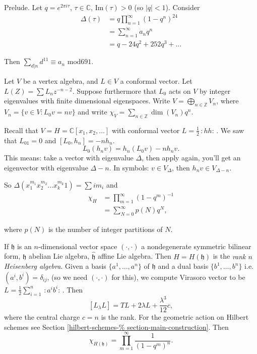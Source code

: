 \medskip\noindent
Prelude. Let $q=e^{2\pi i\tau}$, $\tau \in
\mathbb{C}$,
$\text{Im}(\tau)>0$ (so  $|q|<1$).
Consider
$$
\begin{aligned}
\Delta(\tau)&=q\prod_{n=1}^\infty(1-q^n)^{24}
\\
&=\sum_{n=1}^\infty a_n q^n\\
&=q-24q^2+252q^3+\ldots
\end{aligned}
$$

\noindent
Then $\sum_{d|n}d^{11}\equiv a_n\text{ mod
}691$.

\medskip\noindent
Let $V$ be a vertex algebra,
and $L \in V$ a conformal vector.
Let $L(Z)=\sum L_nz^{-n-2}$.
Suppose furthermore that $L_0$ acts on $V$
by integer eigenvalues with finite
dimensional eigenspaces.
Write $V=\bigoplus_{n \in \mathbb{Z}}V_n$,
where $V_n=\{v \in V:L_0v=nv\}$
and write $\chi_V = \sum_{n \in
\mathbb{Z}}\dim(V_n)q^n$.

\begin{example}
\label{example-heisenberg-character}
Recall that $V=H=\mathbb{C}[x_1,x_2,\ldots]$
with conformal vector
$L=\frac{1}{2}\,:\!hh\!:\,$.
We saw that $L_01=0$ and $[L_0,h_n]=-nh_n$.
$$
L_0(h_nv)=h_n(L_0v)-nh_nv.
$$
This means: take a vector with eigenvalue
$\Delta$,
then apply again, you'll get an eigenvector
with eigenvalue
$\Delta-n$. In symbols: $v \in V_\Delta$,
then
$h_nv \in V_{\Delta-n}$.

So $\Delta(x_1^{m_1}x_2^{m_2}\ldots
x_k^{m_k}1)=\sum i m_i$
and
\begin{equation}
\label{equation-character-heisenberg}
\begin{aligned}
\chi_H&=\prod_{m=1}^\infty(1-q^m)^{-1}\\
&=\sum_{N=0}^\infty p(N)q^N,
\end{aligned}
\end{equation}

\noindent
where $p(N)$ is the number of integer
partitions of $N$.
\end{example}

\begin{example}
\label{example-rank-n-heisenberg}
If $\mathfrak{h}$ is an $n$-dimensional
vector space
$(\cdot,\cdot)$ a nondegenerate symmetric
bilinear form,
$\mathfrak{h}$ abelian Lie algebra,
$\hat{\mathfrak{h}}$
affine Lie algebra. Then $H=H(\mathfrak{h})$
is the {\it rank $n$ Heisenberg algebra}.
Given a basis $\{a^1,\ldots,a^n\}$ of
$\mathfrak{h}$
and a dual basis $\{b^1,\ldots,b^n\}$
i.e. $(a^i,b^i)=\delta_{ij}$,
(so we need $(\cdot,\cdot)$ for this),
we compute Virasoro vector to be
$L=\frac{1}{2}\sum_{i=1}^n\,:\!a^ib^i\!:\,$.
Then
$$
[L_\lambda L]=TL+2\lambda
L+\frac{\lambda^3}{12}c,
$$
where the central charge $c=n$ is the rank.
For the geometric action on Hilbert schemes
see Section \ref{hilbert-schemes-%
section-main-construction}.
Then
\begin{equation}
\label{equation-character-rank-r}
\chi_{H(\mathfrak{h})}=\prod_{m=1}^\infty
\frac{1}{(1-q^m)^n}.
\end{equation}
\end{example}

